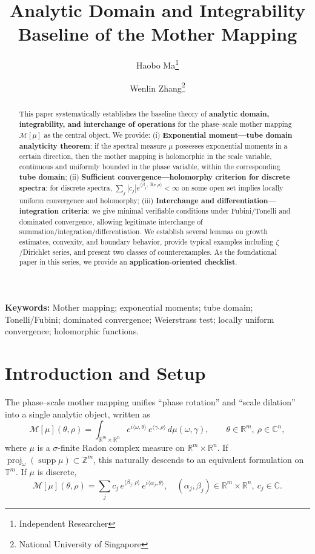 \documentclass[11pt,a4paper]{article}
\title{Analytic Domain and Integrability Baseline of the Mother Mapping}
\author{Haobo Ma\thanks{Independent Researcher} \and Wenlin Zhang\thanks{National University of Singapore}}
\date{}
\theoremstyle{remark}
\DeclareMathOperator{\Re}{Re}
\DeclareMathOperator{\proj}{proj}
\DeclareMathOperator{\supp}{supp}
\begin{document}
\maketitle


\begin{abstract}
This paper systematically establishes the baseline theory of \textbf{analytic domain, integrability, and interchange of operations} for the phase--scale mother mapping $\mathcal{M}[\mu]$ as the central object. We provide: (i) \textbf{Exponential moment---tube domain analyticity theorem}: if the spectral measure $\mu$ possesses exponential moments in a certain direction, then the mother mapping is holomorphic in the scale variable, continuous and uniformly bounded in the phase variable, within the corresponding \textbf{tube domain}; (ii) \textbf{Sufficient convergence---holomorphy criterion for discrete spectra}: for discrete spectra, $\sum_j|c_j|e^{\langle\beta_j,\Re\rho\rangle}<\infty$ on some open set implies locally uniform convergence and holomorphy; (iii) \textbf{Interchange and differentiation---integration criteria}: we give minimal verifiable conditions under Fubini/Tonelli and dominated convergence, allowing legitimate interchange of summation/integration/differentiation. We establish several lemmas on growth estimates, convexity, and boundary behavior, provide typical examples including $\zeta$/Dirichlet series, and present two classes of counterexamples. As the foundational paper in this series, we provide an \textbf{application-oriented checklist}.
\end{abstract}

\noindent\textbf{Keywords:} Mother mapping; exponential moments; tube domain; Tonelli/Fubini; dominated convergence; Weierstrass test; locally uniform convergence; holomorphic functions.

\section{Introduction and Setup}

The phase--scale mother mapping unifies ``phase rotation'' and ``scale dilation'' into a single analytic object, written as
\begin{equation}
\mathcal{M}[\mu](\theta,\rho)=\int_{\mathbb{R}^m\times\mathbb{R}^n}
e^{i\langle\omega,\theta\rangle}\,e^{\langle\gamma,\rho\rangle}\,d\mu(\omega,\gamma),
\qquad \theta\in\mathbb{R}^m,\ \rho\in\mathbb{C}^n,
\end{equation}
where $\mu$ is a $\sigma$-finite Radon complex measure on $\mathbb{R}^m\times\mathbb{R}^n$. If $\proj_\omega(\supp\mu)\subset\mathbb{Z}^m$, this naturally descends to an equivalent formulation on $\mathbb{T}^m$. If $\mu$ is discrete,
\begin{equation}
\mathcal{M}[\mu](\theta,\rho)=\sum_{j} c_j\,e^{\langle\beta_j,\rho\rangle}\,e^{i\langle\alpha_j,\theta\rangle},
\quad (\alpha_j,\beta_j)\in\mathbb{R}^m\times\mathbb{R}^n,\ c_j\in\mathbb{C}.
\end{equation}
\end{document}
